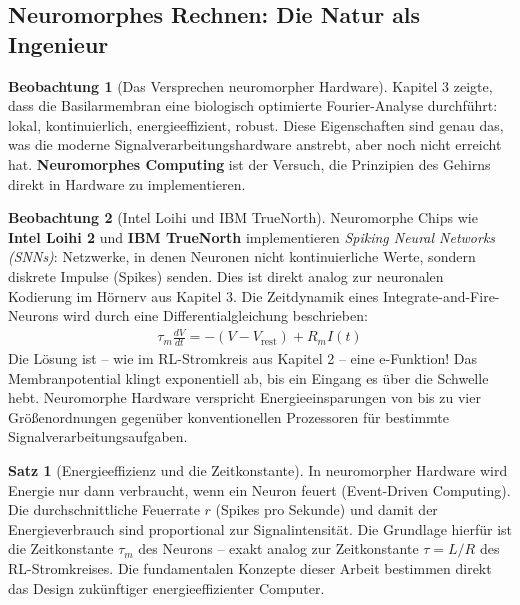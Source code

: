 ﻿\documentclass[a4paper,12pt]{report}
\theoremstyle{definition}
\newtheorem{satz}{Satz}
\newtheorem{beobachtung}{Beobachtung}
\begin{document}
	\subsection{Neuromorphes Rechnen: Die Natur als Ingenieur}
	
	\begin{beobachtung}[Das Versprechen neuromorpher Hardware]
		Kapitel 3 zeigte, dass die Basilarmembran eine biologisch optimierte Fourier-Analyse durchführt: lokal, kontinuierlich, energieeffizient, robust. Diese Eigenschaften sind genau das, was die moderne Signalverarbeitungshardware anstrebt, aber noch nicht erreicht hat. \textbf{Neuromorphes Computing} ist der Versuch, die Prinzipien des Gehirns direkt in Hardware zu implementieren.
	\end{beobachtung}
	
	\begin{beobachtung}[Intel Loihi und IBM TrueNorth]
		Neuromorphe Chips wie \textbf{Intel Loihi 2} und \textbf{IBM TrueNorth} implementieren \emph{Spiking Neural Networks (SNNs)}: Netzwerke, in denen Neuronen nicht kontinuierliche Werte, sondern diskrete Impulse (Spikes) senden. Dies ist direkt analog zur neuronalen Kodierung im Hörnerv aus Kapitel 3. Die Zeitdynamik eines Integrate-and-Fire-Neurons wird durch eine Differentialgleichung beschrieben:
		\begin{align}
			\tau_m \frac{dV}{dt} = -(V - V_{\text{rest}}) + R_m I(t)
		\end{align}
		Die Lösung ist -- wie im RL-Stromkreis aus Kapitel 2 -- eine e-Funktion! Das Membranpotential klingt exponentiell ab, bis ein Eingang es über die Schwelle hebt. Neuromorphe Hardware verspricht Energieeinsparungen von bis zu vier Größenordnungen gegenüber konventionellen Prozessoren für bestimmte Signalverarbeitungsaufgaben.
	\end{beobachtung}
	
	\begin{satz}[Energieeffizienz und die Zeitkonstante]
		In neuromorpher Hardware wird Energie nur dann verbraucht, wenn ein Neuron feuert (Event-Driven Computing). Die durchschnittliche Feuerrate $r$ (Spikes pro Sekunde) und damit der Energieverbrauch sind proportional zur Signalintensität. Die Grundlage hierfür ist die Zeitkonstante $\tau_m$ des Neurons -- exakt analog zur Zeitkonstante $\tau = L/R$ des RL-Stromkreises. Die fundamentalen Konzepte dieser Arbeit bestimmen direkt das Design zukünftiger energieeffizienter Computer.
	\end{satz}
	
\end{document}
